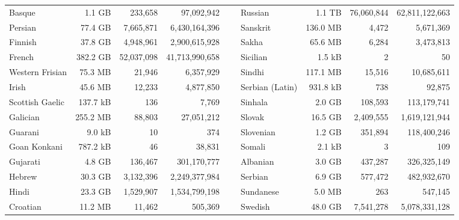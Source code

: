\begin{table}[ht!]
{\begin{tabular}{lrrrclrrr}
            Basque                      & 1.1 GB    & 233,658     & 97,092,942      & ~ & Russian           & 1.1 TB    & 76,060,844 & 62,811,122,663 \\
            Persian                     & 77.4 GB   & 7,665,871   & 6,430,164,396   & ~ & Sanskrit          & 136.0 MB  & 4,472      & 5,671,369      \\
            Finnish                     & 37.8 GB   & 4,948,961   & 2,900,615,928   & ~ & Sakha             & 65.6 MB   & 6,284      & 3,473,813      \\
            French                      & 382.2 GB  & 52,037,098  & 41,713,990,658  & ~ & Sicilian          & 1.5 kB    & 2          & 50             \\
            Western Frisian             & 75.3 MB   & 21,946      & 6,357,929       & ~ & Sindhi            & 117.1 MB  & 15,516     & 10,685,611     \\
            Irish                       & 45.6 MB   & 12,233      & 4,877,850       & ~ & Serbian (Latin)   & 931.8 kB  & 738        & 92,875         \\
            Scottish Gaelic             & 137.7 kB  & 136         & 7,769           & ~ & Sinhala           & 2.0 GB    & 108,593    & 113,179,741    \\
            Galician                    & 255.2 MB  & 88,803      & 27,051,212      & ~ & Slovak            & 16.5 GB   & 2,409,555  & 1,619,121,944  \\
            Guarani                     & 9.0 kB    & 10          & 374             & ~ & Slovenian         & 1.2 GB    & 351,894    & 118,400,246    \\
            Goan Konkani                & 787.2 kB  & 46          & 38,831          & ~ & Somali            & 2.1 kB    & 3          & 109            \\
            Gujarati                    & 4.8 GB    & 136,467     & 301,170,777     & ~ & Albanian          & 3.0 GB    & 437,287    & 326,325,149    \\
            Hebrew                      & 30.3 GB   & 3,132,396   & 2,249,377,984   & ~ & Serbian           & 6.9 GB    & 577,472    & 482,932,670    \\
            Hindi                       & 23.3 GB   & 1,529,907   & 1,534,799,198   & ~ & Sundanese         & 5.0 MB    & 263        & 547,145        \\
            Croatian                    & 11.2 MB   & 11,462      & 505,369         & ~ & Swedish           & 48.0 GB   & 7,541,278  & 5,078,331,128  \\

\end{tabular}}
\end{table}
